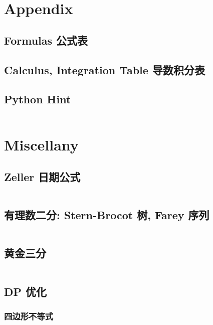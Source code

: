 \documentclass[titlepage, a4paper, 11pt]{article}
\begin{document}
\begin{spacing}{1.15}
			
			\section{Appendix}
				\begin{spacing}{0.4}
				\subsection{Formulas 公式表}
					
				\subsection{Calculus, Integration Table 导数积分表}
					
					
				\subsection{Python Hint}
					\inputminted{python}{src/Miscellany/py.py}
				\end{spacing}

			\section{Miscellany}
				\subsection{Zeller 日期公式}
					\inputminted{cpp}{src/Miscellany/日期公式.cpp}
				\subsection{有理数二分: Stern-Brocot 树, Farey 序列}
					\inputminted{python}{src/yzh/farey.py}
				\subsection{黄金三分}
					\inputminted[highlightlines={7}]{cpp}{src/yzh/golden_ternary.cpp}
				\subsection{DP 优化}
				\subsubsection{四边形不等式}
					\inputminted{cpp}{src/Miscellany/2D1D.cpp}
					

\end{spacing}
\end{document}
